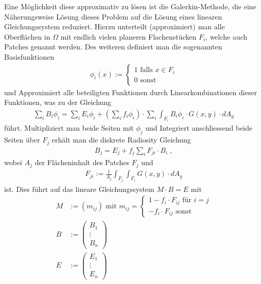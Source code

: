 Eine Möglichkeit diese approximativ zu lösen ist die Galerkin-Methode, die eine Näherungsweise Lösung dieses Problem auf die Lösung eines linearen Gleichungssystem reduziert.
Hierzu unterteilt (approximiert) man  alle  Oberflächen  in $\Omega$ mit endlich vielen planeren Flachenstücken $F_i$, welche auch  Patches genannt werden.
Des weiteren definiert man die sogenannten Basisfunktionen 
\begin{align}
\phi_i(x) := \begin{cases}
1 \text{ falls } x \in F_i \\
0 \text{ sonst}
\end{cases}
\end{align}
und Approximiert alle beteiligten Funktionen durch Linearkombinationen dieser Funktionen, was zu der Gleichung 
\begin{align}
\sum_i B_i \phi_i    =  \sum_i E_i  \phi_i +  ( \sum_i f_i \phi_i)  \cdot  \sum_i \displaystyle \int_{F_i}    B_i \phi_i   \cdot G(x,y) \cdot   dA_y   
\end{align}
führt. Multipliziert man beide Seiten mit $\phi_j$ und Integriert anschliessend beide Seiten über $F_j$  erhält man die diskrete Radiosity Gleichung
\begin{align}
B_j     =  E_j    +  f_j \sum_i    F_{ji} \cdot B_i \;  ,
\end{align}
wobei $A_j$ der Flächeninhalt des Patches $F_j$ und 
\begin{align}
F_{ji} := \frac{1}{A_j}\displaystyle \int_{F_j}  \displaystyle \int_{F_i}   G(x,y) \cdot   dA_y 
\end{align}
 ist.  Dies führt auf das lineare Gleichungssystem $M \cdot B = E$ mit 
\begin{align}
M &:= (m_{ij}) \text{ mit } m_{ij} = \begin{cases} 1- f_i \cdot F_{ij}  \text{ für } i = j \\  - f_i \cdot F_{ij} \text{ sonst} \end{cases} \\
B &:= \begin{pmatrix} B_1 \\ \vdots \\ B_n
\end{pmatrix} \\
E &:= \begin{pmatrix} E_1 \\ \vdots \\ E_n
\end{pmatrix}
\end{align}



